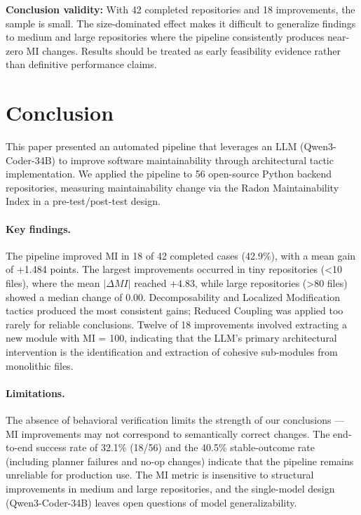 \documentclass[sigconf,review,anonymous]{acmart}
\begin{document}
\textbf{Conclusion validity:} With 42 completed repositories and 18 improvements, the sample is small. The size-dominated effect makes it difficult to generalize findings to medium and large repositories where the pipeline consistently produces near-zero MI changes. Results should be treated as early feasibility evidence rather than definitive performance claims.


\section{Conclusion}
\label{sec:conclusion}

This paper presented an automated pipeline that leverages an LLM (Qwen3-Coder-34B) to improve software maintainability through architectural tactic implementation. We applied the pipeline to 56 open-source Python backend repositories, measuring maintainability change via the Radon Maintainability Index in a pre-test/post-test design.

\paragraph{Key findings.}
The pipeline improved MI in 18 of 42 completed cases (42.9\%), with a mean gain of +1.484 points. The largest improvements occurred in tiny repositories (<10 files), where the mean $|\Delta MI|$ reached +4.83, while large repositories (>80 files) showed a median change of 0.00. Decomposability and Localized Modification tactics produced the most consistent gains; Reduced Coupling was applied too rarely for reliable conclusions. Twelve of 18 improvements involved extracting a new module with MI = 100, indicating that the LLM's primary architectural intervention is the identification and extraction of cohesive sub-modules from monolithic files.

\paragraph{Limitations.}
The absence of behavioral verification limits the strength of our conclusions — MI improvements may not correspond to semantically correct changes. The end-to-end success rate of 32.1\% (18/56) and the 40.5\% stable-outcome rate (including planner failures and no-op changes) indicate that the pipeline remains unreliable for production use. The MI metric is insensitive to structural improvements in medium and large repositories, and the single-model design (Qwen3-Coder-34B) leaves open questions of model generalizability.
\end{document}
